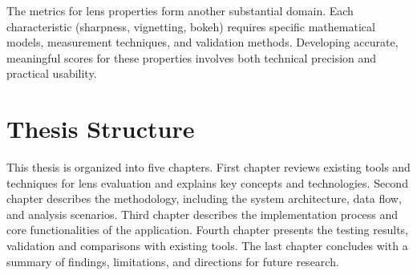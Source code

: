 The metrics for lens properties form another substantial domain. Each characteristic (sharpness, vignetting, bokeh) requires specific mathematical models, measurement techniques, and validation methods. Developing accurate, meaningful scores for these properties involves both technical precision and practical usability.


\section*{Thesis Structure}
This thesis is organized into five chapters. First chapter reviews existing tools and techniques for lens evaluation and explains key concepts and technologies. Second chapter describes the methodology, including the system architecture, data flow, and analysis scenarios. Third chapter describes the implementation process and core functionalities of the application. Fourth chapter presents the testing results, validation and comparisons with existing tools. The last chapter concludes with a summary of findings, limitations, and directions for future research.
